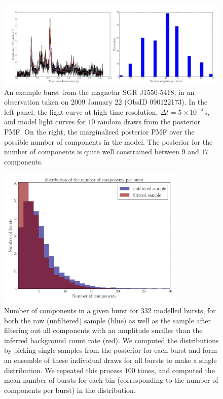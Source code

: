 \documentclass[12pt]{emulateapj}
\begin{document}
\begin{figure}[htbp]
\includegraphics[width=\textwidth]{example_dnest_result.pdf}
\caption{An example burst from the magnetar SGR J1550-5418, in an observation taken on 2009 January 22 (ObsID 090122173). In the left
panel, the light curve at high time resolution, $\Delta t = 5 \times 10^{-4}\,\mathrm{s}$, and model light curves for $10$ random draws from the posterior PMF. 
On the right, the marginalised posterior PMF over the possible number of components in the model. The posterior for the number of components is 
quite well constrained between $9$ and $17$ components.}
\label{fig:dnest_example}
\end{figure}
\begin{figure}[htbp]
\begin{center}
\includegraphics[width=9cm]{sgr1550_nspikes.pdf}
\caption{Number of components in a given burst for $332$ modelled bursts, for both the raw (unfiltered) sample (blue) as well as the sample after
filtering out all components with an amplitude smaller than the inferred background count rate (red). We computed the distributions by picking single samples
from the posterior for each burst and form an ensemble of these individual draws for all bursts to make a single distribution. We repeated this process $100$ times,
and computed the mean number of bursts for each bin (corresponding to the number of components per burst) in the distribution.}
\label{fig:spikes}
\end{center}
\end{figure}
\end{document}
